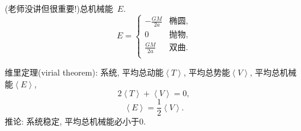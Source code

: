 (老师没讲但很重要!)总机械能~$E$.
\begin{equation*}
    E =
    \begin{cases}
        -\frac{GM}{2a} & \text{椭圆}, \\
         0 & \text{抛物}, \\
         \frac{GM}{2a} & \text{双曲}. \\
    \end{cases}
\end{equation*}

维里定理(virial theorem): 系统, 平均总动能$\left\langle T\right\rangle$, 平均总势能$\left\langle V\right\rangle$, 平均总机械能$\left\langle E\right\rangle$,
\begin{equation*}
    2\left\langle T\right\rangle+\left\langle V\right\rangle = 0,
\end{equation*}
\begin{equation*}
    \left\langle E\right\rangle = \frac{1}{2}\left\langle V\right\rangle.
\end{equation*}
推论: 系统稳定, 平均总机械能必小于0.
